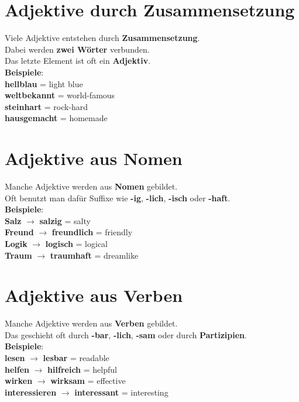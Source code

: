 \documentclass[a4paper]{article}
\begin{document}
    
    \section{Adjektive durch Zusammensetzung}
        Viele Adjektive entstehen durch \textbf{Zusammensetzung}.\\
        Dabei werden \textbf{zwei W\"orter} verbunden.\\
        Das letzte Element ist oft ein \textbf{Adjektiv}.\\
        \textbf{Beispiele}:\\
        \textbf{hellblau} = light blue\\
        \textbf{weltbekannt} = world-famous\\
        \textbf{steinhart} = rock-hard\\
        \textbf{hausgemacht} = homemade\\
    
    
    \section{Adjektive aus Nomen}
        Manche Adjektive werden aus \textbf{Nomen} gebildet.\\
        Oft benutzt man daf\"ur Suffixe wie \textbf{-ig}, \textbf{-lich}, \textbf{-isch} oder \textbf{-haft}.\\
        \textbf{Beispiele}:\\
        \textbf{Salz} $\rightarrow$ \textbf{salzig} = salty\\
        \textbf{Freund} $\rightarrow$ \textbf{freundlich} = friendly\\
        \textbf{Logik} $\rightarrow$ \textbf{logisch} = logical\\
        \textbf{Traum} $\rightarrow$ \textbf{traumhaft} = dreamlike\\
    
    
    \section{Adjektive aus Verben}
        Manche Adjektive werden aus \textbf{Verben} gebildet.\\
        Das geschieht oft durch \textbf{-bar}, \textbf{-lich}, \textbf{-sam} oder durch \textbf{Partizipien}.\\
        \textbf{Beispiele}:\\
        \textbf{lesen} $\rightarrow$ \textbf{lesbar} = readable\\
        \textbf{helfen} $\rightarrow$ \textbf{hilfreich} = helpful\\
        \textbf{wirken} $\rightarrow$ \textbf{wirksam} = effective\\
        \textbf{interessieren} $\rightarrow$ \textbf{interessant} = interesting\\
    
\end{document}
